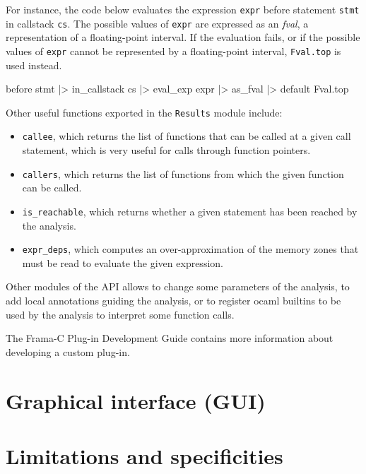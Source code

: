 \documentclass{frama-c-book}
\begin{document}
For instance, the code below evaluates the expression \lstinline|expr|
before statement \lstinline|stmt| in callstack \lstinline|cs|. The possible
values of \lstinline|expr| are expressed as an \emph{fval}, a representation
of a floating-point interval. If the evaluation fails, or if the possible values
of \lstinline|expr| cannot be represented by a floating-point interval,
\lstinline|Fval.top| is used instead.
\begin{ocamlcode}
before stmt |> in_callstack cs |>
eval_exp expr |> as_fval |> default Fval.top
\end{ocamlcode}

Other useful functions exported in the \lstinline|Results| module include:
\begin{itemize}
  \item \lstinline|callee|, which returns the list of functions that can be
    called at a given call statement, which is very useful for calls through
    function pointers.
  \item \lstinline|callers|, which returns the list of functions from which the
    given function can be called.
  \item \lstinline |is_reachable|, which returns whether a given statement has
    been reached by the analysis.
  \item \lstinline|expr_deps|, which computes an over-approximation of the
    memory zones that must be read to evaluate the given expression.
\end{itemize}

Other modules of the \Eva{} API allows to change some parameters of the
analysis, to add local annotations guiding the analysis, or to register
ocaml builtins to be used by the analysis to interpret some function calls.

The Frama-C Plug-in Development Guide contains more information about
developing a custom plug-in.

\chapter{Graphical interface (GUI)}\label{gui}
\vspace{2cm}


\chapter{Limitations and specificities}\label{limitations_specificities}
\vspace{2cm}
\end{document}
